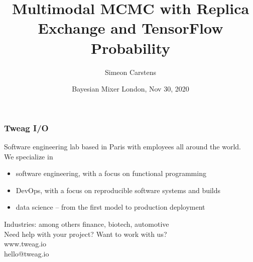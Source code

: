 \documentclass[t,aspectratio=169]{beamer}
\title{Multimodal MCMC with Replica Exchange and TensorFlow Probability}
\date{Bayesian Mixer London, Nov 30, 2020}
\author{Simeon Carstens}
\begin{document}
\begin{frame}
  \titlepage
\end{frame}

\begin{frame}
  \frametitle{Tweag I/O}
  Software engineering lab based in Paris with employees all around the world.\\
  \bigskip
  We specialize in
  \begin{itemize}
  \item software engineering, with a focus on functional programming
  \item DevOps, with a focus on reproducible software systems and builds
  \item data science -- from the first model to production deployment
  \end{itemize}
  Industries: among others finance, biotech, automotive\\
  \bigskip
  Need help with your project? Want to work with us?\\
  \bigskip
  \centering
  www.tweag.io\\
  \bigskip
  hello@tweag.io
\end{frame}
\end{document}

